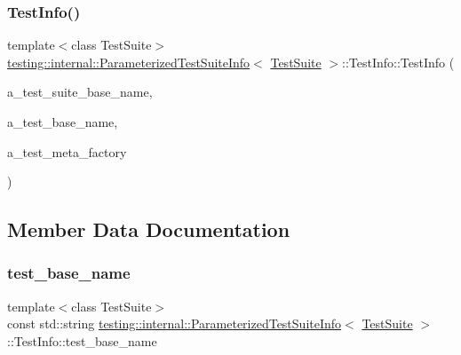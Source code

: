 \subsubsection{\texorpdfstring{TestInfo()}{TestInfo()}\hspace{0.1cm}{\footnotesize\ttfamily [2/2]}}
{\footnotesize\ttfamily template$<$class Test\+Suite$>$ \\
\mbox{\hyperlink{classtesting_1_1internal_1_1_parameterized_test_suite_info}{testing\+::internal\+::\+Parameterized\+Test\+Suite\+Info}}$<$ \mbox{\hyperlink{classtesting_1_1_test_suite}{Test\+Suite}} $>$\+::Test\+Info\+::\+Test\+Info (\begin{DoxyParamCaption}\item[{const char $\ast$}]{a\+\_\+test\+\_\+suite\+\_\+base\+\_\+name,  }\item[{const char $\ast$}]{a\+\_\+test\+\_\+base\+\_\+name,  }\item[{\mbox{\hyperlink{classtesting_1_1internal_1_1_test_meta_factory_base}{Test\+Meta\+Factory\+Base}}$<$ \mbox{\hyperlink{classtesting_1_1internal_1_1_parameterized_test_suite_info_a10761bd750a6820a8d8d2c654b10fe54}{Param\+Type}} $>$ $\ast$}]{a\+\_\+test\+\_\+meta\+\_\+factory }\end{DoxyParamCaption})\hspace{0.3cm}{\ttfamily [inline]}}



\subsection{Member Data Documentation}
\mbox{\label{structtesting_1_1internal_1_1_parameterized_test_suite_info_1_1_test_info_a1c3faeadf1be6b9fd32f0321d9bfafce}} 
\subsubsection{\texorpdfstring{test\_base\_name}{test\_base\_name}}
{\footnotesize\ttfamily template$<$class Test\+Suite$>$ \\
const std\+::string \mbox{\hyperlink{classtesting_1_1internal_1_1_parameterized_test_suite_info}{testing\+::internal\+::\+Parameterized\+Test\+Suite\+Info}}$<$ \mbox{\hyperlink{classtesting_1_1_test_suite}{Test\+Suite}} $>$\+::Test\+Info\+::test\+\_\+base\+\_\+name}

